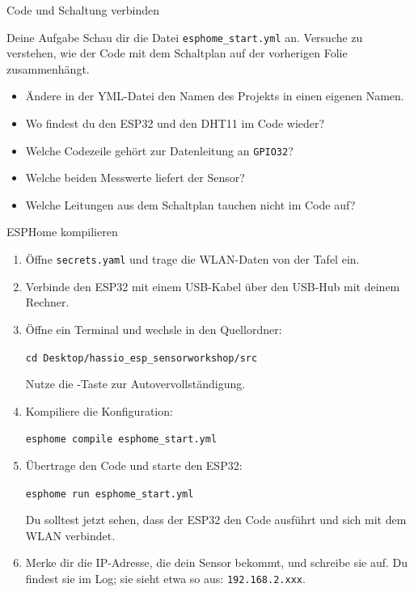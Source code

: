 \documentclass[11pt,aspectratio=169]{beamer}
\begin{document}
\begin{frame}{Code und Schaltung verbinden}
  \begin{block}{Deine Aufgabe}
    Schau dir die Datei \texttt{esphome\_start.yml} an. Versuche zu
    verstehen, wie der Code mit dem Schaltplan auf der vorherigen Folie
    zusammenhängt.
  \end{block}

  \vspace{0.6em}

  \begin{itemize}
    \item Ändere in der YML-Datei den Namen des Projekts in einen eigenen Namen.
    \item Wo findest du den ESP32 und den DHT11 im Code wieder?
    \item Welche Codezeile gehört zur Datenleitung an \texttt{GPIO32}?
    \item Welche beiden Messwerte liefert der Sensor?
    \item Welche Leitungen aus dem Schaltplan tauchen nicht im Code auf?
  \end{itemize}
\end{frame}

\begin{frame}{ESPHome kompilieren}
  \begin{enumerate}
    \item Öffne \texttt{secrets.yaml} und trage die WLAN-Daten von der
      Tafel ein.
    \item Verbinde den ESP32 mit einem USB-Kabel über den USB-Hub mit
      deinem Rechner.
    \item Öffne ein Terminal und wechsle in den Quellordner:
      \begin{center}
        \texttt{cd Desktop/hassio\_esp\_sensorworkshop/src}
      \end{center}
      {\footnotesize Nutze die -Taste zur Autovervollständigung.}
    \item Kompiliere die Konfiguration:
      \begin{center}
        \texttt{esphome compile esphome\_start.yml}
      \end{center}
    \item Übertrage den Code und starte den ESP32:
      \begin{center}
        \texttt{esphome run esphome\_start.yml}
      \end{center}
      {\footnotesize Du solltest jetzt sehen, dass der ESP32 den Code
        ausführt und sich mit dem WLAN verbindet.}
    \item Merke dir die IP-Adresse, die dein Sensor bekommt, und schreibe
      sie auf. Du findest sie im Log; sie sieht etwa so aus:
      \texttt{192.168.2.xxx}.
  \end{enumerate}
\end{frame}
\end{document}
